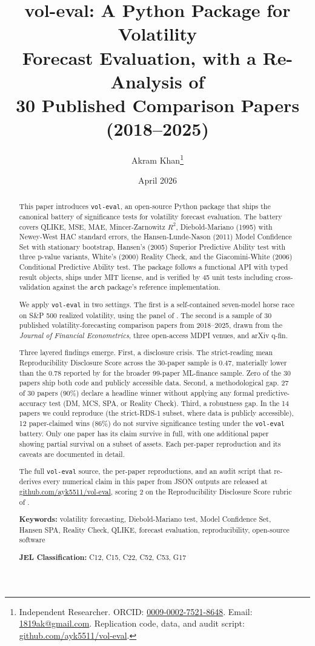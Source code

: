 \documentclass[12pt,a4paper]{article}
\title{vol-eval: A Python Package for Volatility\\
Forecast Evaluation, with a Re-Analysis of\\
30 Published Comparison Papers (2018--2025)}
\author{
    Akram Khan\thanks{Independent Researcher. ORCID: \href{https://orcid.org/0009-0002-7521-8648}{0009-0002-7521-8648}. Email: \href{mailto:1819ak@gmail.com}{1819ak@gmail.com}. Replication code, data, and audit script: \href{https://github.com/ayk5511/vol-eval}{github.com/ayk5511/vol-eval}.}
}
\date{April 2026}
\begin{document}
\maketitle

\begin{abstract}
This paper introduces \texttt{vol-eval}, an open-source Python package that ships the canonical battery of significance tests for volatility forecast evaluation. The battery covers QLIKE, MSE, MAE, Mincer-Zarnowitz $R^2$, Diebold-Mariano (1995) with Newey-West HAC standard errors, the Hansen-Lunde-Nason (2011) Model Confidence Set with stationary bootstrap, Hansen's (2005) Superior Predictive Ability test with three p-value variants, White's (2000) Reality Check, and the Giacomini-White (2006) Conditional Predictive Ability test. The package follows a functional API with typed result objects, ships under MIT license, and is verified by 45 unit tests including cross-validation against the \texttt{arch} package's reference implementation.

We apply \texttt{vol-eval} in two settings. The first is a self-contained seven-model horse race on S\&P 500 realized volatility, using the panel of \citet{KhanVol2026}. The second is a sample of 30 published volatility-forecasting comparison papers from 2018--2025, drawn from the \emph{Journal of Financial Econometrics}, three open-access MDPI venues, and arXiv q-fin.

Three layered findings emerge. First, a disclosure crisis. The strict-reading mean Reproducibility Disclosure Score across the 30-paper sample is 0.47, materially lower than the 0.78 reported by \citet{Khan2026Survey} for the broader 99-paper ML-finance sample. Zero of the 30 papers ship both code and publicly accessible data. Second, a methodological gap. 27 of 30 papers (90\%) declare a headline winner without applying any formal predictive-accuracy test (DM, MCS, SPA, or Reality Check). Third, a robustness gap. In the 14 papers we could reproduce (the strict-RDS-1 subset, where data is publicly accessible), 12 paper-claimed wins (86\%) do not survive significance testing under the \texttt{vol-eval} battery. Only one paper has its claim survive in full, with one additional paper showing partial survival on a subset of assets. Each per-paper reproduction and its caveats are documented in detail.

The full \texttt{vol-eval} source, the per-paper reproductions, and an audit script that re-derives every numerical claim in this paper from JSON outputs are released at \href{https://github.com/ayk5511/vol-eval}{github.com/ayk5511/vol-eval}, scoring 2 on the Reproducibility Disclosure Score rubric of \citet{Khan2026Survey}.

\medskip
\noindent\textbf{Keywords:} volatility forecasting, Diebold-Mariano test, Model Confidence Set, Hansen SPA, Reality Check, QLIKE, forecast evaluation, reproducibility, open-source software

\medskip
\noindent\textbf{JEL Classification:} C12, C15, C22, C52, C53, G17
\end{abstract}
\end{document}

